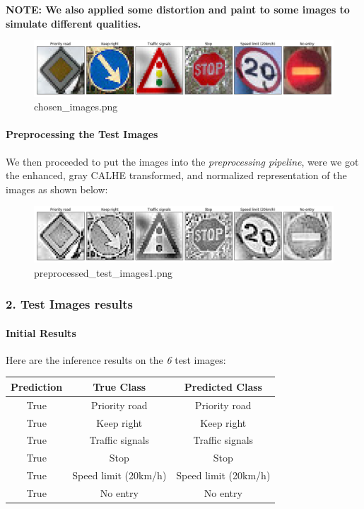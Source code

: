 \documentclass[11pt]{article}
\makeatletter
\def\maxwidth{\ifdim\Gin@nat@width>\linewidth\linewidth
    \else\Gin@nat@width\fi}
\let\Oldincludegraphics\includegraphics
\renewcommand{\includegraphics}[1]{\Oldincludegraphics[width=.8\maxwidth]{#1}}
\makeatother
\begin{document}
\textbf{NOTE: We also applied some distortion and paint to some images
to simulate different qualities.}

\begin{figure}
\centering
\includegraphics{./assets/chosen_images.png}
\caption{chosen\_images.png}
\end{figure}

\hypertarget{preprocessing-the-test-images}{%
\paragraph{Preprocessing the Test
Images}\label{preprocessing-the-test-images}}

We then proceeded to put the images into the \emph{preprocessing
pipeline}, were we got the enhanced, gray CALHE transformed, and
normalized representation of the images as shown below:

\begin{figure}
\centering
\includegraphics{./assets/preprocessed_test_images1.png}
\caption{preprocessed\_test\_images1.png}
\end{figure}

    \hypertarget{test-images-results}{%
\subsubsection{2. Test Images results}\label{test-images-results}}

\hypertarget{initial-results}{%
\paragraph{Initial Results}\label{initial-results}}

Here are the inference results on the \emph{6} test images:

\begin{longtable}[]{@{}ccc@{}}
\toprule
Prediction & True Class & Predicted Class\tabularnewline
\midrule
\endhead
{True} & Priority road & Priority road\tabularnewline
{True} & Keep right & Keep right\tabularnewline
{True} & Traffic signals & Traffic signals\tabularnewline
{True} & Stop & Stop\tabularnewline
{True} & Speed limit (20km/h) & Speed limit (20km/h)\tabularnewline
{True} & No entry & No entry\tabularnewline
\bottomrule
\end{longtable}
\end{document}
